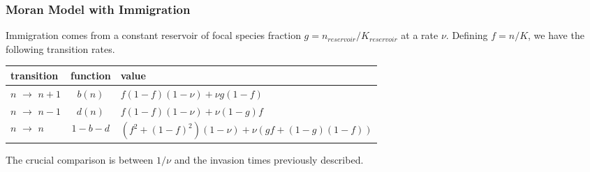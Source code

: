 \documentclass{beamer}
\begin{document}
\begin{frame}
\frametitle{Moran Model with Immigration}
Immigration comes from a constant reservoir of focal species fraction $g=n_{reservoir}/K_{reservoir}$ at a rate $\nu$. 
Defining $f=n/K$, we have the following transition rates. 
\footnotesize{
\begin{center}
	\begin{tabular}{l|c|l}
		transition		& function	& value \\
		\hline
		$n$ $\rightarrow$ $n+1$	& $b(n)$	& $f(1-f)(1-\nu) + \nu g(1-f)$ \\
		$n$ $\rightarrow$ $n-1$	& $d(n)$	& $f(1-f)(1-\nu) + \nu (1-g)f$ \\
		$n$ $\rightarrow$ $n$	& $1-b-d$	& $\left(f^2+(1-f)^2\right)(1-\nu) + \nu\left(gf+(1-g)(1-f)\right)$
	\end{tabular}
\end{center}
}
\pause
The crucial comparison is between $1/\nu$ and the invasion times previously described. 
\end{frame}


\iffalse
\begin{frame}
\frametitle{Infrequent Immigration}
\centering
The model recovers qualitative experimental results. 
\\
(See Vega and Gore, \emph{PLoS Biology}, 2017.)
\texttt{[image: Goregraphs]}
\begin{columns}
	\begin{column}{3cm}
		\begin{center}
			\texttt{[image: Moran-withimmigration-A]}
		\end{center}
	\end{column}
	\begin{column}{3cm}
		\begin{center}
			\texttt{[image: Moran-withimmigration-B]}
		\end{center}
	\end{column}
		\begin{column}{3cm}
		\begin{center}
			\texttt{[image: Moran-withimmigration-C]}
		\end{center}
	\end{column}
	\begin{column}{3cm}
		\begin{center}
			\texttt{[image: Moran-withimmigration-D]}
		\end{center}
	\end{column}
\end{columns}
\end{frame}
\fi
\end{document}
